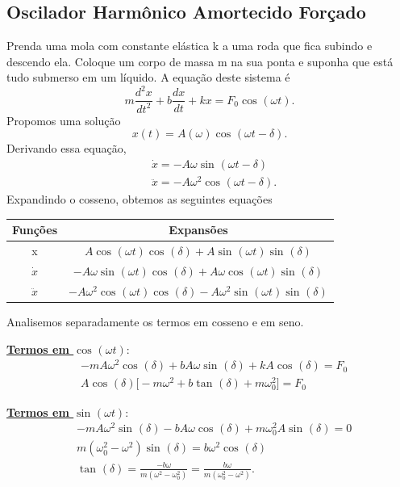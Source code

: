 \documentclass{article}
\begin{document}
\subsection{Oscilador Harmônico Amortecido Forçado}
  Prenda uma mola com constante elástica k a uma roda que fica subindo e descendo ela. Coloque um corpo de massa m na sua ponta e 
suponha que está tudo submerso em um líquido. A equação deste sistema é 
  \[
    m \frac{d^{2}x}{dt^{2}} + b \frac{dx}{dt} + kx = F_{0}\cos^{}{(\omega t)}.
  \]
  Propomos uma solução 
  \[
    x(t) = A(\omega ) \cos^{}{(\omega t - \delta )}.
  \]
  Derivando essa equação, 
 \begin{align*}
   &\dot x = -A\omega \sin^{}{(\omega t - \delta )}\\
   &\ddot x = -A\omega ^{2}\cos^{}{(\omega t - \delta )}.
 \end{align*}
  Expandindo o cosseno, obtemos as seguintes equações
 \begin{center}
   \begin{table}[h]
   \centering
     \begin{tabular}{| c | c |}
       \hline 
       Funções & Expansões\\
       \hline
       x & \(A\cos^{}{(\omega t )}\cos^{}{(\delta )} + A \sin^{}{(\omega t)}\sin^{}{(\delta )}\)\\
       \(\dot x\) & \(-A\omega \sin^{}{(\omega t)}\cos^{}{(\delta )} + A\omega \cos^{}{(\omega t)}\sin^{}{(\delta )}\)\\
       \(\ddot x\) & \(-A\omega^{2}\cos^{}{(\omega t)}\cos^{}{(\delta )} - A\omega ^{2}\sin^{}{(\omega t)}\sin^{}{(\delta )}\)\\
       \hline
     \end{tabular}
   \end{table}
 \end{center}
 
 Analisemos separadamente os termos em cosseno e em seno.

 \underline{\textbf{Termos em \(\cos^{}{(\omega t)}\)}}:
\begin{align*}
  &-mA\omega ^{2}\cos^{}{(\delta )} + b A\omega \sin^{}{(\delta )} + kA \cos^{}{(\delta )} = F_{0}\\
  &A\cos^{}{(\delta )}\biggl[-m\omega ^{2} + b \tan^{}{(\delta )} + m\omega_{0}^{2}\biggr] = F_{0}
\end{align*}

\underline{\textbf{Termos em \(\sin^{}{(\omega t)}\)}}:
\begin{align*}
  &-mA\omega ^{2}\sin^{}{(\delta )} - bA\omega\cos^{}{(\delta )} + m\omega_{0}^{2}A\sin^{}{(\delta )} = 0\\
  &m(\omega_{0}^{2}-\omega ^{2})\sin^{}{(\delta )}=b\omega^{2}\cos^{}{(\delta )}\\
  &\tan^{}{(\delta )}=\frac{-b\omega}{m(\omega ^{2}-\omega_{0}^{2})} = \frac{b\omega}{m(\omega_{0}^{2}-\omega ^{2})}.
\end{align*}
\end{document}

